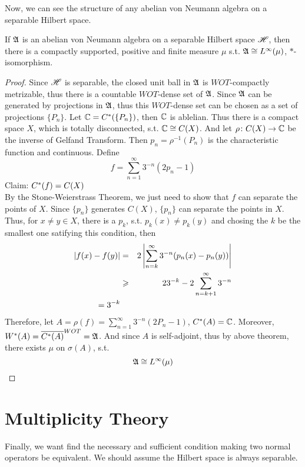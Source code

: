 \documentclass[a4paper,11pt]{report}
\begin{document}
Now, we can see the structure of any abelian von Neumann algebra on a separable Hilbert space.
\begin{thm}
	If $\mathfrak{A}$ is an abelian von Neumann algebra on a separable Hilbert space $\mathscr{H}$, then there is a compactly supported, positive and finite measure $\mu$ s.t. $\mathfrak{A} \cong L^{\infty}(\mu)$, $*$-isomorphism.
\end{thm}
\begin{proof}
	Since $\mathscr{H}$ is separable, the closed unit ball in $\mathfrak{A}$ is $WOT$-compactly metrizable, thus there is a countable $WOT$-dense set of $\mathfrak{A}$. Since $\mathfrak{A}$ can be generated by projections in $\mathfrak{A}$, thus this $WOT$-dense set can be chosen as a set of projections $\{P_n\}$. Let $\mathbb{C} = C^{*}(\{P_n\})$, then $\mathbb{C}$ is ablelian. Thus there is a compact space $X$, which is totally disconnected, s.t. $\mathbb{C} \cong C(X)$. And let $\rho \colon C(X) \rightarrow \mathbb{C}$ be the inverse of Gelfand Transform. Then $p_n = \rho^{-1}(P_n)$ is the characteristic function and continuous. Define
	\begin{equation*}
		f = \sum_{n=1}^{\infty} 3^{-n}(2p_n - 1)
	\end{equation*}
	Claim: $C^{*}(f) = C(X)$ \\
	By the Stone-Weierstrass Theorem, we just need to show that $f$ can separate the points of $X$. Since $\{p_n\}$ generates $C(X)$, $\{p_n\}$ can separate the points in $X$. Thus, for $x \neq y \in X$, there is a $p_k$, s.t. $p_k(x) \neq p_k(y)$ and chosing the $k$ be the smallest one satifying this condition, then
	\begin{eqnarray*}
		\left\lvert f(x)-f(y)\right\lvert &=& 2 \left\lvert\sum_{n=k}^{\infty} 3^{-n}(p_n(x) - p_n(y))\right\lvert \\
		&\geqslant& 2 3^{-k} - 2 \sum_{n=k+1}^{\infty} 3^{-n} \\
		= 3^{-k}
	\end{eqnarray*}
	Therefore, let $A = \rho(f) = \sum_{n=1}^{\infty} 3^{-n}(2P_n - 1)$, $C^{*}(A) = \mathbb{C}$. Moreover, $W^{*}(A) = \overline{C^{*}(A)}^{WOT} = \mathfrak{A}$. And since $A$ is self-adjoint, thus by above theorem, there exists $\mu$ on $\sigma(A)$, s.t.
	\begin{equation*}
		\mathfrak{A} \cong L^{\infty}(\mu) \qedhere
	\end{equation*}
\end{proof}

\section{Multiplicity Theory}

Finally, we want find the necessary and sufficient condition making two normal operators be equivalent. We should assume the Hilbert space is always separable.
\end{document}
